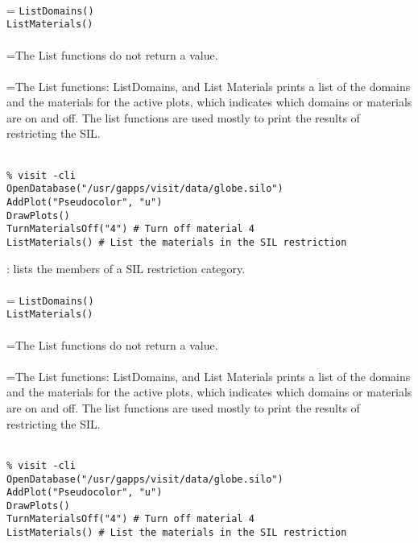 \documentclass[10pt,a4paper]{report}
\begin{document}
 \\ 
\hangindent=\parindent 
\verb!ListDomains()!\\ 
\verb!ListMaterials()!\\ [-3mm]

 \\ 
\hangindent=\parindent The List functions do not return a value. \\[-3mm] 

 \\ 
\hangindent=\parindent The List functions: ListDomains, and List Materials prints a list of the domains and the materials for the active plots, which indicates which domains or materials are on and off. The list functions are used mostly to print the results of restricting the SIL. \\[-3mm] 

\\[-6mm]
\begin{verbatim}% visit -cli
OpenDatabase("/usr/gapps/visit/data/globe.silo")
AddPlot("Pseudocolor", "u")
DrawPlots()
TurnMaterialsOff("4") # Turn off material 4
ListMaterials() # List the materials in the SIL restriction 
\end{verbatim}
\newpage


{}
: lists the members of a SIL restriction category.\\[-3mm]

 \\ 
\hangindent=\parindent 
\verb!ListDomains()!\\ 
\verb!ListMaterials()!\\ [-3mm]

 \\ 
\hangindent=\parindent The List functions do not return a value. \\[-3mm] 

 \\ 
\hangindent=\parindent The List functions: ListDomains, and List Materials prints a list of the domains and the materials for the active plots, which indicates which domains or materials are on and off. The list functions are used mostly to print the results of restricting the SIL. \\[-3mm] 

\\[-6mm]
\begin{verbatim}% visit -cli
OpenDatabase("/usr/gapps/visit/data/globe.silo")
AddPlot("Pseudocolor", "u")
DrawPlots()
TurnMaterialsOff("4") # Turn off material 4
ListMaterials() # List the materials in the SIL restriction 
\end{verbatim}
\newpage
\end{document}
